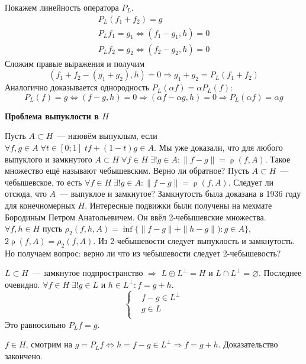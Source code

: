 \documentclass[14pt]{extarticle}
\DeclareMathOperator{\rh}{\rho}
\begin{document}
Покажем линейность оператора $P_L$.
\begin{gather*}
    P_L(f_1 + f_2) = g\\
    P_Lf_1 = g_1 \Leftrightarrow (f_1 - g_1, h) = 0\\
    P_Lf_2 = g_2 \Leftrightarrow (f_2 - g_2, h) = 0
\end{gather*}
Сложим правые выражения и получим
$$
(f_1 + f_2 - (g_1 + g_2), h) = 0 \Rightarrow g_1 + g_2 = P_L(f_1 + f_2)
$$
Аналогично доказывается однородность $P_L(\alpha f) = \alpha P_L(f)$: 
$$
P_L(f) = g \Leftrightarrow (f - g, h) = 0\Rightarrow (\alpha f - \alpha g, h) = 0\Rightarrow P_L(\alpha f) = \alpha g
$$

\textbf{Проблема выпуклости в $H$}

Пусть $A \subset H$~--- назовём выпуклым, если $\forall f,g \in A\;\forall t \in [0;1]\;t f + (1 - t) g \in A$.
Мы уже доказали, что для любого выпуклого и замкнутого $A \subset H\;\forall f \in H\;\exists! g \in A\colon \|f - g\| = \rh(f, A)$.
Такое множество ещё называют чебышевским.
Верно ли обратное? Пусть $A \subset H$~--- чебышевское, то есть $\forall f \in H\;\exists! g \in A\colon \|f - g\| = \rh(f,A)$. 
Следует ли отсюда, что $A$~--- выпуклое и замкнутое?
Замкнутость была доказана в 1936 году для конечномерных $H$.
Интересные подвижки были получены на мехмате Бородиным Петром Анатольевичем.
Он ввёл 2-чебышевские множества.
$\forall f,h \in H$ пусть $\rho_2(f, h, A) = \inf\{\|f - g\| + \|h - g\|):g \in A\}$, $2\rh(f, A) = \rho_2(f, A)$.
Из 2-чебышевости следует выпуклость и замкнутость.
Но получаем вопрос: верно ли что из чебышевости следует 2-чебышевость?

\begin{Theor}
    $L \subset H$~--- замкнутое подпространство $\Rightarrow$ $L \oplus L^\perp = H$ и $L \cap L^\perp = \varnothing$.
    Последнее очевидно. 
    $\forall f \in H\;\exists! g \in L$ и $h \in L^\perp\colon f = g + h$.
    $$
    \left\{
        \begin{aligned}
            &f - g \in L^\perp\\
            &g \in L\\
        \end{aligned}
    \right.
    $$
    Это равносильно $P_Lf = g$.
\end{Theor}
\begin{Proof}
$f \in H$, смотрим на $g = P_Lf \Leftrightarrow h = f - g \in L^\perp\Rightarrow f = g + h$.
Доказательство закончено.
\end{Proof}
\end{document}
